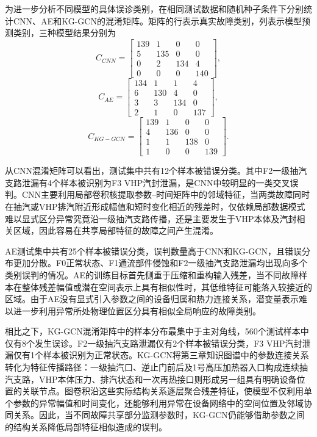 为进一步分析不同模型的具体误诊类别，在相同测试数据和随机种子条件下分别统计CNN、AE和KG-GCN的混淆矩阵。矩阵的行表示真实故障类别，列表示模型预测类别，三种模型结果分别为
\begin{equation}
C_{CNN}=\begin{bmatrix}
139&1&0&0\\
5&135&0&0\\
0&2&134&4\\
0&0&0&140
\end{bmatrix},
\end{equation}
\begin{equation}
C_{AE}=\begin{bmatrix}
134&1&1&4\\
6&130&4&0\\
3&3&134&0\\
2&1&0&137
\end{bmatrix},
\end{equation}
\begin{equation}
C_{KG-GCN}=\begin{bmatrix}
139&1&0&0\\
4&136&0&0\\
1&1&138&0\\
1&0&0&139
\end{bmatrix}.
\end{equation}

从CNN混淆矩阵可以看出，测试集中共有12个样本被错误分类。其中F2一级抽汽支路泄漏有4个样本被识别为F3 VHP汽封泄漏，是CNN中较明显的一类交叉误判。CNN主要利用局部卷积核提取参数--时间矩阵中的邻域特征，当两类故障同时在抽汽或VHP排汽附近形成幅值和短时变化相近的残差时，仅依赖局部数据模式难以显式区分异常究竟沿一级抽汽支路传播，还是主要发生于VHP本体及汽封相关区域，因此容易在共享局部特征的故障之间产生混淆。

AE测试集中共有25个样本被错误分类，误判数量高于CNN和KG-GCN，且错误分布更加分散。F0正常状态、F1通流部件侵蚀和F2一级抽汽支路泄漏均出现向多个类别误判的情况。AE的训练目标首先侧重于压缩和重构输入残差，当不同故障样本在整体残差幅值或潜在空间表示上具有相似性时，其低维特征可能落入较接近的区域。由于AE没有显式引入参数之间的设备归属和热力连接关系，潜变量表示难以进一步利用异常所处物理位置区分具有相似全局响应的故障类别。

相比之下，KG-GCN混淆矩阵中的样本分布最集中于主对角线，560个测试样本中仅有8个发生误诊。F2一级抽汽支路泄漏仅有2个样本被错误分类，F3 VHP汽封泄漏仅有1个样本被识别为正常状态。KG-GCN将第三章知识图谱中的参数连接关系转化为特征传播路径：一级抽汽口、逆止门前后及1号高压加热器入口构成连续抽汽支路，VHP本体压力、排汽状态和一次再热接口则形成另一组具有明确设备位置的关联节点。图卷积沿这些实际结构关系逐层聚合残差特征，使模型不仅利用单个参数的异常幅值和时间变化，还能够利用异常在设备网络中的空间位置及邻域协同关系。因此，当不同故障共享部分监测参数时，KG-GCN仍能够借助参数之间的结构关系降低局部特征相似造成的误判。

